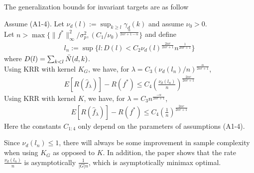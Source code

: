 The generalization bounds for invariant targets are as follow
\begin{theorem}\label{theo1}
    Assume (A1-4). Let $\nu_d(l):= \sup_{k\ge l}\gamma_d(k)$ and assume $\nu_0>0$.\\
    Let $n> \max\{\|f^*\|^2_\infty/\sigma^2_p,(C_1/\nu_0)^{\frac{\alpha}{2\alpha r +1-\alpha}}\}$ and define
    \begin{align}
        l_n:=\sup\{l:D(l)<C_2\nu_d(l)^{\frac{2\alpha r}{2\alpha r +1}}n^{\frac{1}{2\alpha r +1}}\}
    \end{align}
    where $D(l)=\sum_{k<l}\Bar{N}(d,k)$.\\
    Using KRR with kernel $K_G$, we have, for $\lambda=C_3(\nu_d(l_n)/n)^{\frac{\alpha}{2\alpha r +1}}$,
    \begin{align}
        E[R(\hat{f}_\lambda)]-R(f^*)\le C_4\left(\frac{\nu_d(l_n)}{n}\right)^{\frac{2\alpha r}{2\alpha r +1}}
    \end{align}
    Using KRR with kernel $K$, we have, for $\lambda=C_3n^{\frac{-\alpha}{2\alpha r +1}}$,
    \begin{align}
        E[R(\hat{f}_\lambda)]-R(f^*)\le C_4\left(\frac{1}{n}\right)^{\frac{2\alpha r}{2\alpha r +1}}
    \end{align}
    Here the constants $C_{1:4}$ only depend on the parameters of assumptions (A1-4).
\end{theorem}
Since $\nu_d(l_n)\le 1$, there will always be some improvement in sample complexity when using $K_G$ as opposed to $K$. In addition, the paper shows that the rate $\frac{\nu_d(l_n)}{n}$ is asymptotically $\frac{1}{|G|n}$, which is asymptotically minimax optimal.

